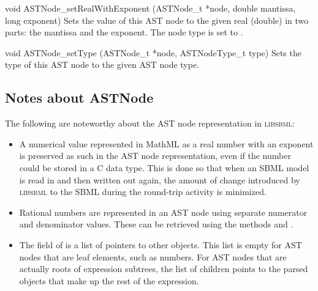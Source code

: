 \documentclass{sbmlmanual}
\newcommand{\libsbml}{\textsc{libsbml}}
\begin{document}
\begin{methoddef}{void ASTNode\_setRealWithExponent (ASTNode\_t *node, double mantissa, long exponent)}
  Sets the value of this AST node to the given real (double) in two parts:
  the mantissa and the exponent.  The node type is set to
  .
\end{methoddef}


\begin{methoddef}{void ASTNode\_setType (ASTNode\_t *node, ASTNodeType\_t type)}
  Sets the type of this AST node to the given AST node type.
\end{methoddef}


\subsection{Notes about ASTNode}

The following are noteworthy about the AST node representation in \libsbml{}:

\begin{itemize}
  
\item A numerical value represented in MathML as a real number with an
  exponent is preserved as such in the AST node representation, even if the
  number could be stored in a C  data type.  This is done so
  that when an SBML model is read in and then written out again, the amount
  of change introduced by \libsbml{} to the SBML during the round-trip
  activity is minimized.
  
\item Rational numbers are represented in an AST node using separate
  numerator and denominator values.  These can be retrieved using the
   methods  and
  .
   
  
\item The  field of  is a list of
  pointers to other  objects.  This list is empty for AST
  nodes that are leaf elements, such as numbers.  For AST nodes that are
  actually roots of expression subtrees, the list of children points to the
  parsed objects that make up the rest of the expression.

\end{itemize}







\clearpage



\end{document}

